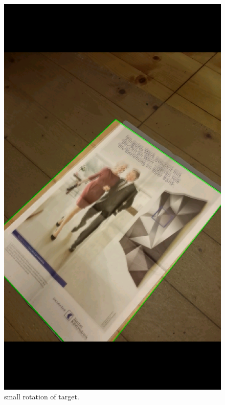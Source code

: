 \documentclass[10pt,conference,compsocconf]{IEEEtran}
\begin{document}
\begin{figure}[t]
    \hspace{0.0cm}
    \begin{minipage}[t]{0.33\textwidth}
        \includegraphics[width=\columnwidth]{Screenshot_2014-01-21-22-59-52.png}
        \caption{small rotation of target.}
        \label{fig:rot}
    \end{minipage}
    \hspace{0.0cm}
    \begin{minipage}[t]{0.33\textwidth}

\end{minipage}
\end{figure}
\end{document}
